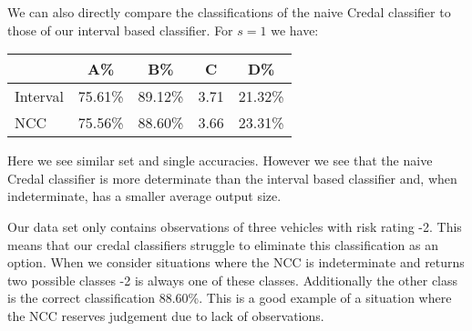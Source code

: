 We can also directly compare the classifications of the naive Credal classifier to those of our interval based classifier. For $s=1$ we have:
\begin{center}
\begin{tabular}{l|c c c c}
         & A\%     & B\%     & C    & D\%     \\
\hline
Interval & 75.61\% & 89.12\% & 3.71 & 21.32\% \\
NCC      & 75.56\% & 88.60\% & 3.66 & 23.31\% \\
\end{tabular}
\end{center}
Here we see similar set and single accuracies.
However we see that the naive Credal classifier is more determinate than the interval based classifier and, when indeterminate, has a smaller average output size.

Our data set only contains observations of three vehicles with risk rating -2.
This means that our credal classifiers struggle to eliminate this classification as an option.
When we consider situations where the NCC is indeterminate and returns two possible classes -2 is always one of these classes.
Additionally the other class is the correct classification 88.60\%.
This is a good example of a situation where the NCC reserves judgement due to lack of observations.